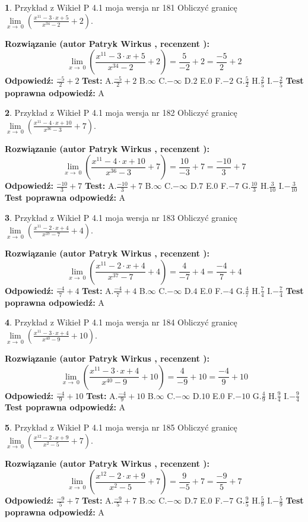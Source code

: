 \documentclass[12pt, a4paper]{article}
\theoremstyle{definition} %
\newtheorem{zad}{}
\newcommand{\zadStart}[1]{\begin{zad}#1\newline}
\newcommand{\zadStop}{\end{zad}}
\newcommand{\rozwStart}[2]{\noindent \textbf{Rozwiązanie (autor #1 , recenzent #2): }\newline}
\newcommand{\rozwStop}{\newline}
\newcommand{\odpStart}{\noindent \textbf{Odpowiedź:}\newline}
\newcommand{\odpStop}{\newline}
\newcommand{\testStart}{\noindent \textbf{Test:}\newline}
\newcommand{\testStop}{\newline}
\newcommand{\kluczStart}{\noindent \textbf{Test poprawna odpowiedź:}\newline}
\newcommand{\kluczStop}{\newline}
\begin{document}
\zadStart{Przykład z Wikieł P 4.1 moja wersja nr 181}
Obliczyć granicę $\lim\limits_{x\to\ 0}(\frac{x^{11}-3 \cdot x +5}{x^{34}-2}+2)$.
\zadStop
\rozwStart{Patryk Wirkus}{}
$$\lim\limits_{x\to\ 0}(\frac{x^{11}-3 \cdot x +5}{x^{34}-2}+2)=\frac{5}{-2}+2=\frac{-5}{2}+2$$
\rozwStop
\odpStart
$\frac{-5}{2}+2$
\odpStop
\testStart
A.$\frac{-5}{2}+2$
B.$\infty$
C.$-\infty$
D.$2$
E.$0$
F.$-2$
G.$\frac{5}{2}$
H.$\frac{2}{5}$
I.$-\frac{2}{5}$
\testStop
\kluczStart
A
\kluczStop



\zadStart{Przykład z Wikieł P 4.1 moja wersja nr 182}
Obliczyć granicę $\lim\limits_{x\to\ 0}(\frac{x^{11}-4 \cdot x +10}{x^{36}-3}+7)$.
\zadStop
\rozwStart{Patryk Wirkus}{}
$$\lim\limits_{x\to\ 0}(\frac{x^{11}-4 \cdot x +10}{x^{36}-3}+7)=\frac{10}{-3}+7=\frac{-10}{3}+7$$
\rozwStop
\odpStart
$\frac{-10}{3}+7$
\odpStop
\testStart
A.$\frac{-10}{3}+7$
B.$\infty$
C.$-\infty$
D.$7$
E.$0$
F.$-7$
G.$\frac{10}{3}$
H.$\frac{3}{10}$
I.$-\frac{3}{10}$
\testStop
\kluczStart
A
\kluczStop



\zadStart{Przykład z Wikieł P 4.1 moja wersja nr 183}
Obliczyć granicę $\lim\limits_{x\to\ 0}(\frac{x^{11}-2 \cdot x +4}{x^{37}-7}+4)$.
\zadStop
\rozwStart{Patryk Wirkus}{}
$$\lim\limits_{x\to\ 0}(\frac{x^{11}-2 \cdot x +4}{x^{37}-7}+4)=\frac{4}{-7}+4=\frac{-4}{7}+4$$
\rozwStop
\odpStart
$\frac{-4}{7}+4$
\odpStop
\testStart
A.$\frac{-4}{7}+4$
B.$\infty$
C.$-\infty$
D.$4$
E.$0$
F.$-4$
G.$\frac{4}{7}$
H.$\frac{7}{4}$
I.$-\frac{7}{4}$
\testStop
\kluczStart
A
\kluczStop



\zadStart{Przykład z Wikieł P 4.1 moja wersja nr 184}
Obliczyć granicę $\lim\limits_{x\to\ 0}(\frac{x^{11}-3 \cdot x +4}{x^{40}-9}+10)$.
\zadStop
\rozwStart{Patryk Wirkus}{}
$$\lim\limits_{x\to\ 0}(\frac{x^{11}-3 \cdot x +4}{x^{40}-9}+10)=\frac{4}{-9}+10=\frac{-4}{9}+10$$
\rozwStop
\odpStart
$\frac{-4}{9}+10$
\odpStop
\testStart
A.$\frac{-4}{9}+10$
B.$\infty$
C.$-\infty$
D.$10$
E.$0$
F.$-10$
G.$\frac{4}{9}$
H.$\frac{9}{4}$
I.$-\frac{9}{4}$
\testStop
\kluczStart
A
\kluczStop



\zadStart{Przykład z Wikieł P 4.1 moja wersja nr 185}
Obliczyć granicę $\lim\limits_{x\to\ 0}(\frac{x^{12}-2 \cdot x +9}{x^{2}-5}+7)$.
\zadStop
\rozwStart{Patryk Wirkus}{}
$$\lim\limits_{x\to\ 0}(\frac{x^{12}-2 \cdot x +9}{x^{2}-5}+7)=\frac{9}{-5}+7=\frac{-9}{5}+7$$
\rozwStop
\odpStart
$\frac{-9}{5}+7$
\odpStop
\testStart
A.$\frac{-9}{5}+7$
B.$\infty$
C.$-\infty$
D.$7$
E.$0$
F.$-7$
G.$\frac{9}{5}$
H.$\frac{5}{9}$
I.$-\frac{5}{9}$
\testStop
\kluczStart
A
\kluczStop
\end{document}
